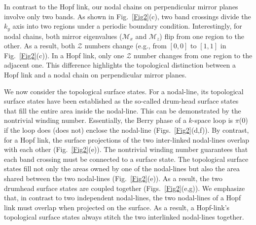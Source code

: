 \documentclass[aps,prl,superscriptaddress,twocolumn,showpacs]{revtex4-1}
\begin{document}
In contrast to the Hopf link, our nodal chains on perpendicular mirror planes involve only two bands. As shown in Fig.~\ref{Fig2}(c), two band crossings divide the $k_y$ axis into two regions under a periodic boundary condition. Interestingly, for nodal chains, both mirror eigenvalues ($\mathcal{M}_x$ and $\mathcal{M}_z$) flip from one region to the other. As a result, both $\mathcal{Z}$ numbers change (e.g., from $[0,0]$ to $[1,1]$ in Fig.~\ref{Fig2}(c)). In a Hopf link, only one $\mathcal{Z}$ number changes from one region to the adjacent one. This difference highlights the topological distinction between a Hopf link and a nodal chain on perpendicular mirror planes.



We now consider the topological surface states. For a nodal-line, its topological surface states have been established as the so-called drum-head surface states that fill the entire area inside the nodal-line. This can be demonstrated by the nontrivial winding number. Essentially, the Berry phase of a $k$-space loop is $\pi$($0$) if the loop does (does not) enclose the nodal-line (Figs.~\ref{Fig2}(d,f)). By contrast, for a Hopf link, the surface projections of the two inter-linked nodal-lines overlap with each other (Fig.~\ref{Fig2}(e)). The nontrivial winding number guarantees that each band crossing must be connected to a surface state. The topological surface states fill not only the areas owned by one of the nodal-lines but also the area shared between the two nodal-lines (Fig.~\ref{Fig2}(e)). As a result, the two drumhead surface states are coupled together (Figs.~\ref{Fig2}(e,g)). We emphasize that, in contrast to two independent nodal-lines, the two nodal-lines of a Hopf link must overlap when projected on the surface. As a result, a Hopf-link's topological surface states always stitch the two interlinked nodal-lines together.
\end{document}
